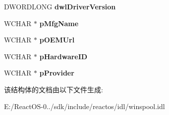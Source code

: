 \begin{DoxyCompactItemize}
D\+W\+O\+R\+D\+L\+O\+NG {\bfseries dwl\+Driver\+Version}
\item 
\mbox{\label{struct___w_i_n_s_p_o_o_l___d_r_i_v_e_r___i_n_f_o__6_acb784e32bc2eeae2065e2300d82e15d5}} 
W\+C\+H\+AR $\ast$ {\bfseries p\+Mfg\+Name}
\item 
\mbox{\label{struct___w_i_n_s_p_o_o_l___d_r_i_v_e_r___i_n_f_o__6_a77ce153ecb8749ac06682e0dbe2c24a8}} 
W\+C\+H\+AR $\ast$ {\bfseries p\+O\+E\+M\+Url}
\item 
\mbox{\label{struct___w_i_n_s_p_o_o_l___d_r_i_v_e_r___i_n_f_o__6_aa6c52f3c20256fed313d620291f97cf5}} 
W\+C\+H\+AR $\ast$ {\bfseries p\+Hardware\+ID}
\item 
\mbox{\label{struct___w_i_n_s_p_o_o_l___d_r_i_v_e_r___i_n_f_o__6_af83515b87fe118b1f70983097e956bf1}} 
W\+C\+H\+AR $\ast$ {\bfseries p\+Provider}
\end{DoxyCompactItemize}


该结构体的文档由以下文件生成\+:\begin{DoxyCompactItemize}
\item 
E\+:/\+React\+O\+S-\/0../sdk/include/reactos/idl/winspool.\+idl\end{DoxyCompactItemize}
